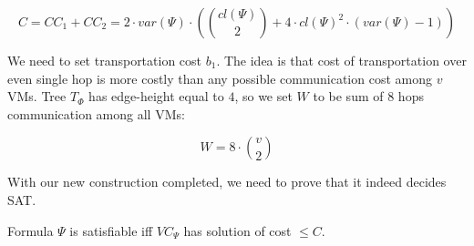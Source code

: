 $$ C = CC_1 + CC_2 = 2 \cdot var(\Psi) \cdot ({ cl(\Psi) \choose 2} +
4 \cdot cl(\Psi) ^2 \cdot (var(\Psi) - 1)) $$


We need to set transportation cost $b_1$. The idea is that cost of
transportation over even single hop is more costly than any possible
communication cost among $v$ VMs. Tree $T_{\Phi}$ has edge-height
equal to $4$, so we set $W$ to be sum of 8 hops communication among
all VMs:

$$ W = 8 \cdot {v \choose 2} $$

With our new construction completed, we need to prove that it indeed
decides SAT.

\begin{theorem}Formula $\Psi$ is satisfiable iff $VC_{\Psi}$ has
solution of cost $\leq C$.
\end{theorem}

